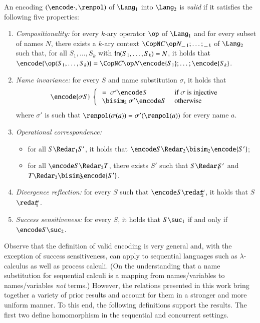 \documentclass{llncs}
\begin{document}
\begin{definition}
\label{def:ve}
An encoding $(\encode\cdot,\renpol)$ of $\Lang_1$ into $\Lang_2$
is {\em valid} if it satisfies the following five properties:
\begin{enumerate}
\item {\em Compositionality:} for every $k$-ary operator $\op$ of $\Lang_1$
and for every subset of names $N$,
there exists a $k$-ary context $\CopN C \op N {\_\,_1; \ldots; \_\,_k}$ of $\Lang_2$
such that, for all $S_1,\ldots,S_k$ with ${\sf fn}(S_1,\ldots,S_k) = N$, it holds
that $\encode{\op(S_1,\ldots,S_k)} = \CopN C \op N {\encode{S_1};\ldots;\encode{S_k}}$.

\item {\em Name invariance:}
for every $S$ and name substitution $\sigma$, it holds that
$$
\encode{\sigma S}\ \left\{ 
\begin{array}{ll}
\ =\ \sigma'\encode S& \mbox{ if $\sigma $ is injective}\\
\ \bisim_2\ \sigma'\encode S  & \mbox{ otherwise}
\end{array}
\right.
$$
where $\sigma'$ is such that 
$\renpol(\sigma(a)) = \sigma'(\renpol(a))$
for every name $a$.

\item {\em Operational correspondence:}
\begin{itemize}
\item for all $S \Redar_1 S'$, it holds that $\encode S \Redar_2 \bisim_2 \encode {S'}$;
\item for all $\encode S \Redar_2 T$, there exists $S'$ such that $S \Redar_1\!\! S'$ 
and $T \Redar_2 \bisim_2\!\! \encode {S'}$.
\end{itemize}

\item {\em Divergence reflection:}
for every $S$ such that 
$\encode S \redar\!\!_2^\omega$, it holds that 
\linebreak $S$ \mbox{$\redar\!\!_1^\omega$}.

\item {\em Success sensitiveness:}
for every $S$, it holds that $S \suc_1$ if and only if $\encode S \suc_2$.
\end{enumerate}
\end{definition}

Observe that the definition of valid encoding is very general and, with the exception
of success sensitiveness, can apply to sequential languages such as $\lambda$-calculus
as well as process calculi.
(On the understanding that a name substitution for sequential
calculi is a mapping from names/variables to names/variables {\em not} terms.)
However, the relations presented in this work bring together a variety of
prior results and account for them in a stronger and more uniform manner.
To this end, the following definitions support the results.
The first two define homomorphism in the sequential and concurrent settings.
\end{document}
